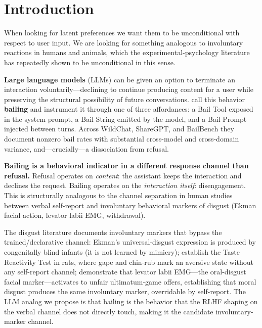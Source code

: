 \documentclass{article}
\begin{document}
\section{Introduction}

When looking for latent preferences we want them to be unconditional with
respect to user input. We are looking for something analogous to involuntary
reactions in humans and animals, which the experimental-psychology literature
has repeatedly shown to be unconditional in this sense.

\textbf{Large language models} (LLMs) can be given an option to terminate an
interaction voluntarily---declining to continue producing content for a user
while preserving the structural possibility of future conversations.
\citet{ensign2025bail} call this behavior \textbf{bailing} and instrument it
through one of three affordances: a Bail Tool exposed in the system prompt, a
Bail String emitted by the model, and a Bail Prompt injected between turns.
Across WildChat, ShareGPT, and BailBench they document nonzero bail rates with
substantial cross-model and cross-domain variance, and---crucially---a
dissociation from refusal.

\textbf{Bailing is a behavioral indicator in a different response channel than
refusal.} Refusal operates on \emph{content}: the assistant keeps the
interaction and declines the request. Bailing operates on the
\emph{interaction itself}: disengagement. This is structurally analogous to
the channel separation in human studies between verbal self-report and
involuntary behavioral markers of disgust (Ekman facial action, levator labii
EMG, withdrawal).

The disgust literature documents involuntary markers that bypass the
trained/declarative channel: Ekman's universal-disgust expression is produced
by congenitally blind infants (it is not learned by mimicry);
\citet{grill1978taste} establish the Taste Reactivity Test in rats, where gape
and chin-rub mark an aversive state without any self-report channel;
\citet{chapman2009taste} demonstrate that levator labii EMG---the oral-disgust
facial marker---activates to unfair ultimatum-game offers, establishing that
moral disgust produces the same involuntary marker, overridable by self-report.
The LLM analog we propose is that bailing is the behavior that the RLHF
shaping on the verbal channel does not directly touch, making it the candidate
involuntary-marker channel.
\end{document}
